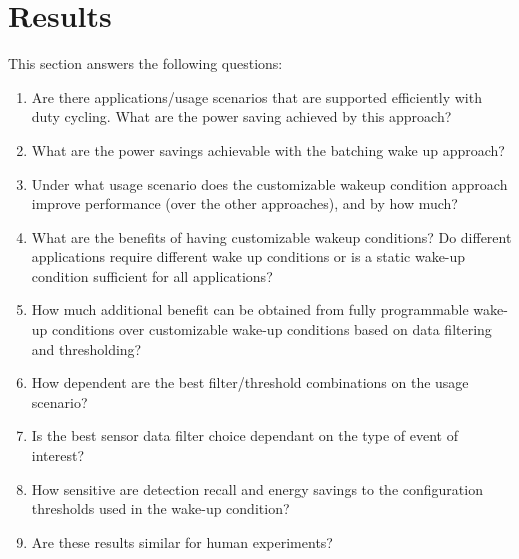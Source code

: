 \section{Results}
\label{sec:results}

This section answers the following questions:

\begin{enumerate}
\setlength{\itemsep}{-3pt}  

\item Are there applications/usage scenarios that are supported
efficiently with duty cycling.  What are the power saving achieved by
this approach?

\item What are the power savings achievable with the batching wake up approach?

\item Under what usage scenario does the customizable wakeup condition approach improve
performance (over the other approaches), and by how much?

\item What are the benefits of having customizable wakeup conditions?  
Do different applications require different wake up conditions or is
a static wake-up condition sufficient for all applications? 

\item How much additional benefit can be obtained from fully programmable wake-up conditions 
over customizable wake-up conditions based on data filtering and thresholding?

\item How dependent are the best filter/threshold combinations on the usage scenario?

\item Is the best sensor data filter choice dependant on the type of event of interest?

\item How sensitive are detection recall and energy savings to the configuration thresholds
used in the wake-up condition?

\item Are these results similar for human experiments?

\end{enumerate}


